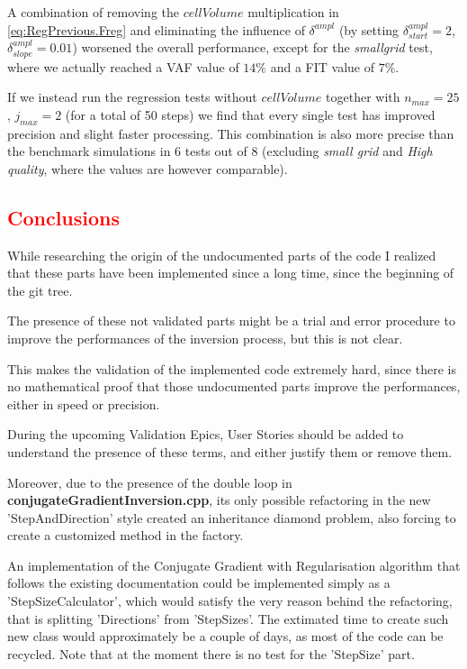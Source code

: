 \documentclass[10pt,a4paper]{article}
\begin{document}
{A combination of removing the $cellVolume$ multiplication in \eqref{eq:RegPrevious.Freg} and eliminating the influence of $\delta^{ampl}$ (by setting $\delta^{ampl}_{start}=2$, $\delta^{ampl}_{slope}=0.01$) worsened the overall performance, except for the \textit{smallgrid} test, where we actually reached a VAF value of $14\%$ and a FIT value of $7\%$.

If we instead run the regression tests without $cellVolume$ together with $n_{max} =25$, $j_{max} =2$ (for a total of 50 steps) we find that every single test has improved precision and slight faster processing.
This combination is also more precise than the benchmark simulations in 6 tests out of 8 (excluding \textit{small grid} and \textit{High quality}, where the values are however comparable).


\textcolor{red}
{\section{Conclusions}}
While researching the origin of the undocumented parts of the code I realized that these parts have been implemented since a long time, since the beginning of the git tree. 

The presence of these not validated parts might be a trial and error procedure to improve the performances of the inversion process, but this is not clear.

This makes the validation of the implemented code extremely hard, since there is no mathematical proof that those undocumented parts improve the performances, either in speed or precision.

During the upcoming Validation Epics, User Stories should be added to understand the presence of these terms, and either justify them or remove them.

Moreover, due to the presence of the double loop in \textbf{conjugateGradientInversion.cpp}, its only possible refactoring in the new 'StepAndDirection' style created an inheritance diamond problem, also forcing to create a customized method in the factory.

An implementation of the Conjugate Gradient with Regularisation algorithm that follows the existing documentation could be implemented simply as a 'StepSizeCalculator', which would satisfy the very reason behind the refactoring, that is splitting 'Directions' from 'StepSizes'. 
The extimated time to create such new class would approximately be a couple of days, as most of the code can be recycled.
Note that at the moment there is no test for the 'StepSize' part.

}
\end{document}
